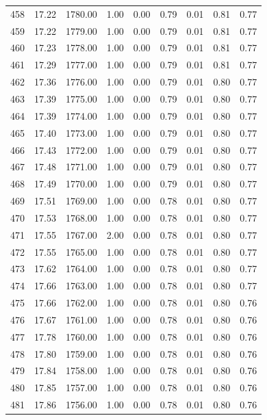 \documentclass{article}\usepackage[]{graphicx}\usepackage[]{color}
\begin{document}
\begin{longtable}{rrrrrrrrr}
  458 & 17.22 & 1780.00 & 1.00 & 0.00 & 0.79 & 0.01 & 0.81 & 0.77 \\ 
  459 & 17.22 & 1779.00 & 1.00 & 0.00 & 0.79 & 0.01 & 0.81 & 0.77 \\ 
  460 & 17.23 & 1778.00 & 1.00 & 0.00 & 0.79 & 0.01 & 0.81 & 0.77 \\ 
  461 & 17.29 & 1777.00 & 1.00 & 0.00 & 0.79 & 0.01 & 0.81 & 0.77 \\ 
  462 & 17.36 & 1776.00 & 1.00 & 0.00 & 0.79 & 0.01 & 0.80 & 0.77 \\ 
  463 & 17.39 & 1775.00 & 1.00 & 0.00 & 0.79 & 0.01 & 0.80 & 0.77 \\ 
  464 & 17.39 & 1774.00 & 1.00 & 0.00 & 0.79 & 0.01 & 0.80 & 0.77 \\ 
  465 & 17.40 & 1773.00 & 1.00 & 0.00 & 0.79 & 0.01 & 0.80 & 0.77 \\ 
  466 & 17.43 & 1772.00 & 1.00 & 0.00 & 0.79 & 0.01 & 0.80 & 0.77 \\ 
  467 & 17.48 & 1771.00 & 1.00 & 0.00 & 0.79 & 0.01 & 0.80 & 0.77 \\ 
  468 & 17.49 & 1770.00 & 1.00 & 0.00 & 0.79 & 0.01 & 0.80 & 0.77 \\ 
  469 & 17.51 & 1769.00 & 1.00 & 0.00 & 0.78 & 0.01 & 0.80 & 0.77 \\ 
  470 & 17.53 & 1768.00 & 1.00 & 0.00 & 0.78 & 0.01 & 0.80 & 0.77 \\ 
  471 & 17.55 & 1767.00 & 2.00 & 0.00 & 0.78 & 0.01 & 0.80 & 0.77 \\ 
  472 & 17.55 & 1765.00 & 1.00 & 0.00 & 0.78 & 0.01 & 0.80 & 0.77 \\ 
  473 & 17.62 & 1764.00 & 1.00 & 0.00 & 0.78 & 0.01 & 0.80 & 0.77 \\ 
  474 & 17.66 & 1763.00 & 1.00 & 0.00 & 0.78 & 0.01 & 0.80 & 0.77 \\ 
  475 & 17.66 & 1762.00 & 1.00 & 0.00 & 0.78 & 0.01 & 0.80 & 0.76 \\ 
  476 & 17.67 & 1761.00 & 1.00 & 0.00 & 0.78 & 0.01 & 0.80 & 0.76 \\ 
  477 & 17.78 & 1760.00 & 1.00 & 0.00 & 0.78 & 0.01 & 0.80 & 0.76 \\ 
  478 & 17.80 & 1759.00 & 1.00 & 0.00 & 0.78 & 0.01 & 0.80 & 0.76 \\ 
  479 & 17.84 & 1758.00 & 1.00 & 0.00 & 0.78 & 0.01 & 0.80 & 0.76 \\ 
  480 & 17.85 & 1757.00 & 1.00 & 0.00 & 0.78 & 0.01 & 0.80 & 0.76 \\ 
  481 & 17.86 & 1756.00 & 1.00 & 0.00 & 0.78 & 0.01 & 0.80 & 0.76 \\ 

\end{longtable}
\end{document}
